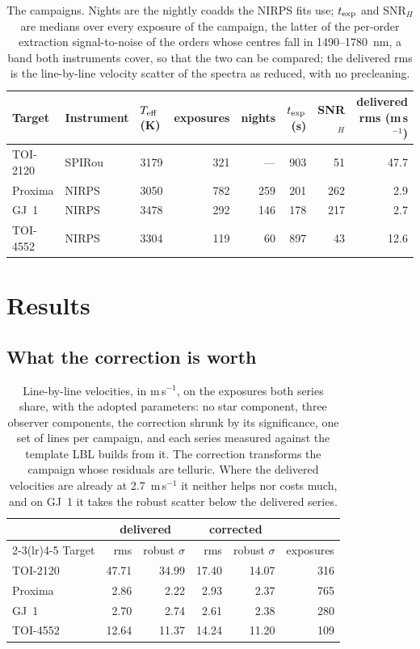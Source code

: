 \documentclass[11pt]{article}
\begin{document}
\begin{table}[h]
\centering
\small
\begin{tabular}{lllrrrrr}
\toprule
Target & Instrument & $T_{\rm eff}$ (K) & exposures & nights & $t_{\rm exp}$ (s)
& SNR$_H$ & delivered rms (m\,s$^{-1}$)\\
\midrule
TOI-2120 & SPIRou & 3179 & 321 & --- & 903 &  51 & 47.7\\
Proxima  & NIRPS  & 3050 & 782 & 259 & 201 & 262 &  2.9\\
GJ~1     & NIRPS  & 3478 & 292 & 146 & 178 & 217 &  2.7\\
TOI-4552 & NIRPS  & 3304 & 119 & 60  & 897 &  43 & 12.6\\
\bottomrule
\end{tabular}
\caption{The campaigns. Nights are the nightly coadds the NIRPS fits use;
$t_{\rm exp}$ and SNR$_H$ are medians over every exposure of the campaign, the
latter of the per-order extraction signal-to-noise of the orders whose centres
fall in 1490--1780~nm, a band both instruments cover, so that the two can be
compared; the delivered rms is the line-by-line velocity scatter of the spectra
as reduced, with no precleaning.}
\label{tab:campaigns}
\end{table}

\section{Results}

\subsection{What the correction is worth}

\begin{table}[h]
\centering
\small
\begin{tabular}{lrrrrr}
\toprule
& \multicolumn{2}{c}{delivered} & \multicolumn{2}{c}{corrected} & \\
\cmidrule(lr){2-3}\cmidrule(lr){4-5}
Target & rms & robust $\sigma$ & rms & robust $\sigma$ & exposures\\
\midrule
TOI-2120 & 47.71 & 34.99 & 17.40 & 14.07 & 316\\
Proxima  &  2.86 &  2.22 &  2.93 &  2.37 & 765\\
GJ~1     &  2.70 &  2.74 &  2.61 &  2.38 & 280\\
TOI-4552 & 12.64 & 11.37 & 14.24 & 11.20 & 109\\
\bottomrule
\end{tabular}
\caption{Line-by-line velocities, in m\,s$^{-1}$, on the exposures both series
share, with the adopted parameters: no star component, three observer
components, the correction shrunk by its significance, one set of lines per
campaign, and each series measured against the template LBL builds from it. The
correction transforms the campaign whose residuals are telluric. Where the
delivered velocities are already at 2.7~m\,s$^{-1}$ it neither helps nor costs
much, and on GJ~1 it takes the robust scatter below the delivered series.}
\label{tab:overall}
\end{table}
\end{document}
